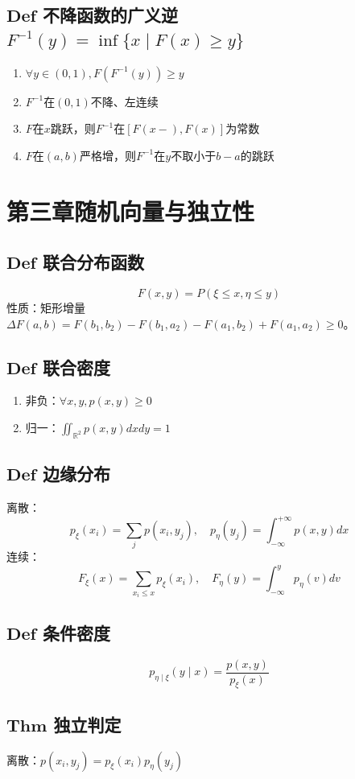 \documentclass{article}
\begin{document}
	\subsection{$\bm{Def}$ 不降函数的广义逆$F^{-1}(y)=\inf\{x\mid F(x)\ge y\}$}
	\begin{enumerate}
		\item $\forall y\in(0,1),F(F^{-1}(y))\ge y$
		\item $F^{-1}$在$(0,1)$不降、左连续
		\item $F$在$x$跳跃，则$F^{-1}$在$[F(x-),F(x)]$为常数
		\item $F$在$(a,b)$严格增，则$F^{-1}$在$y$不取小于$b-a$的跳跃
	\end{enumerate}
	
	\section{第三章\quad 随机向量与独立性}
	\subsection{$\bm{Def}$ 联合分布函数}
	\[
	F(x,y)=P(\xi\le x,\eta\le y)
	\]
	性质：矩形增量$\Delta F(a,b)=F(b_1,b_2)-F(b_1,a_2)-F(a_1,b_2)+F(a_1,a_2)\ge0$。
	\subsection{$\bm{Def}$ 联合密度}
	\begin{enumerate}
		\item 非负：$\forall x,y,p(x,y)\ge0$
		\item 归一：$\displaystyle \iint_{\mathbb{R}^2}p(x,y)dxdy=1$
	\end{enumerate}
	\subsection{$\bm{Def}$ 边缘分布}
	离散：
	\[
	p_{\xi}(x_i)=\sum_jp(x_i,y_j),\quad p_{\eta}(y_j)=\int_{-\infty}^{+\infty}p(x,y)dx
	\]
	连续：
	\[
	F_{\xi}(x)=\sum_{x_i\le x}p_{\xi}(x_i),\quad F_{\eta}(y)=\int_{-\infty}^yp_{\eta}(v)dv
	\]
	\subsection{$\bm{Def}$ 条件密度}
	\[
	p_{\eta\mid\xi}(y\mid x)=\frac{p(x,y)}{p_{\xi}(x)}
	\]
	\subsection{$\bm{Thm}$ 独立判定}
	离散：$p(x_i,y_j)=p_{\xi}(x_i)p_{\eta}(y_j)$
	
\end{document}
